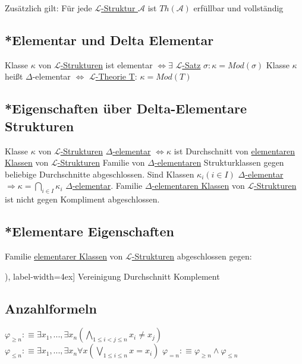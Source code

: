 \documentclass[12pt,a4paper]{article} %
\begin{document}
	Zusätzlich gilt: Für jede \hyperref[Struktur]{$\mathcal{L}$-Struktur $\mathcal{A}$} ist $Th(\mathcal{A})$ erfüllbar und vollständig
	
	\subsection{*Elementar und Delta Elementar}
	\label{Elementar}
	Klasse $\kappa$ von \hyperref[Struktur]{$\mathcal{L}$-Strukturen} ist elementar $\Leftrightarrow \exists$ \hyperref[LSatz]{$\mathcal{L}$-Satz} $\sigma: \kappa = Mod(\sigma)$ \newline
	Klasse $\kappa$ heißt $\Delta$-elementar $\Leftrightarrow$ \hyperref[Theorie]{$\mathcal{L}$-Theorie T}: $\kappa = Mod(T)$
	
	\subsection{*Eigenschaften über Delta-Elementare Strukturen}
	Klasse $\kappa$ von \hyperref[Struktur]{$\mathcal{L}$-Strukturen} \hyperref[Elementar]{$\Delta$-elementar} $\Leftrightarrow \kappa$ ist Durchschnitt von \hyperref[Elementar]{elementaren Klassen} von \hyperref[Struktur]{$\mathcal{L}$-Strukturen} \newline{}
	\newline
	Familie von \hyperref[Elementar]{$\Delta$-elementaren} Strukturklassen gegen beliebige Durchschnitte abgeschlossen. Sind Klassen $\kappa_i (i \in I)$ \hyperref[Elementar]{$\Delta$-elementar} $\Rightarrow \kappa = \bigcap\limits_{i \in I} \kappa_i$ \hyperref[Elementar]{$\Delta$-elementar}. Familie \hyperref[Elementar]{$\Delta$-elementaren Klassen} von \hyperref[Struktur]{$\mathcal{L}$-Strukturen} ist nicht gegen Kompliment abgeschlossen.
	
	\subsection{*Elementare Eigenschaften}
	Familie \hyperref[Elementar]{elementarer Klassen} von \hyperref[Struktur]{$\mathcal{L}$-Strukturen} abgeschlossen gegen:
	\begin{tasks}[counter-format=(tsk[r]), label-width=4ex]
		\task Vereinigung
		\task Durchschnitt
		\task Komplement
	\end{tasks}

	\subsection{Anzahlformeln}
	$\varphi_{\ge n} :\equiv \exists x_1, ..., \exists x_n (\bigwedge\limits_{1 \le i < j \le n} x_i \ne x_j)$ \newline
	$\varphi_{\le n} :\equiv \exists x_1, ..., \exists x_n \forall x (\bigvee\limits_{1 \le i \le n} x = x_i)$ \newline
	$\varphi_{= n} :\equiv \varphi_{\ge n} \land \varphi_{\le n}$
	
\end{document}
